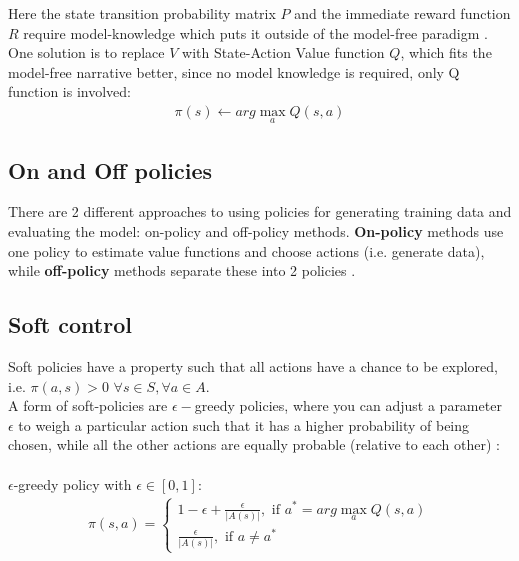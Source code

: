 Here the state transition probability matrix $P$ and 
the immediate reward function $R$ require model-knowledge
which puts it outside of the model-free paradigm \cite{lecture_mfc}. One solution is to replace $V$ with 
State-Action Value function $Q$, which fits the 
model-free narrative better, since no model knowledge
is required, only Q function is involved:  
\begin{align}
    \pi(s) \leftarrow arg \max_{a} Q(s, a) 
\end{align}

\subsection{On and Off policies}
There are 2 different approaches to using policies for 
generating training data and evaluating the model: on-policy and
off-policy methods.
\textbf{On-policy} methods use one policy to estimate value functions and choose actions (i.e. generate data), while \textbf{off-policy} methods separate these into 2 policies \cite{lecture_mfc}. 

\subsection{Soft control}

Soft policies have a property such that all actions have a chance to be explored, i.e. $\pi(a, s) > 0$ $\forall s \in S, \forall a \in A.$\\

A form of soft-policies are $\epsilon-$greedy policies, where 
you can adjust a parameter $\epsilon$ to weigh a particular action such that it has a higher probability of being chosen,
while all the other actions are equally probable (relative to each other) \cite{lecture_mfc}:\\\\
$\epsilon$-greedy policy with $\epsilon \in [0, 1]$:
\begin{align}
    \pi(s, a) = \begin{cases} 
        1 - \epsilon + \frac{\epsilon}{|A(s)|}, \text{ if } a^{*} = arg \max_{a} Q(s, a) \\
        \frac{\epsilon}{|A(s)|}, \text{ if }  a \neq a^*
    \end{cases}   
\end{align}

